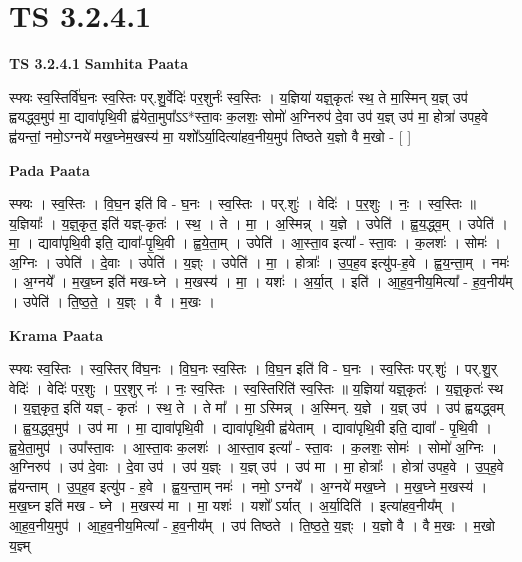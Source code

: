 \documentclass[17pt]{extarticle}
\begin{document}

\section{ TS 3.2.4.1 }

\textbf{TS 3.2.4.1 } \newline
\textbf{Samhita Paata} \newline

स्फ्यः स्व॒स्तिर्वि॑घ॒नः स्व॒स्तिः पर्.शु॒र्वेदिः॑ पर॒शुर्नः॑ स्व॒स्तिः । य॒ज्ञिया॑ यज्ञ्॒कृतः॑ स्थ॒ ते मा॒स्मिन् य॒ज्ञ् उप॑ ह्वयद्ध्व॒मुप॑ मा॒ द्यावा॑पृथि॒वी ह्व॑येता॒मुपा᳚ऽऽ*स्ता॒वः क॒लशः॒ सोमो॑ अ॒ग्निरुप॑ दे॒वा उप॑ य॒ज्ञ् उप॑ मा॒ होत्रा॑ उपह॒वे ह्व॑यन्तां॒ नमो॒ऽग्नये॑ मख॒घ्नेम॒खस्य॑ मा॒ यशो᳚ऽर्या॒दित्या॑हव॒नीय॒मुप॑ तिष्ठते य॒ज्ञो वै म॒खो - [  ] \newline

\textbf{Pada Paata} \newline

स्फ्यः । स्व॒स्तिः । वि॒घ॒न इति॑ वि - घ॒नः । स्व॒स्तिः । पर्.शुः॑ । वेदिः॑ । प॒र॒शुः । नः॒ । स्व॒स्तिः ॥ य॒ज्ञियाः᳚ । य॒ज्ञ्॒कृत॒ इति॑ यज्ञ्-कृतः॑ । स्थ॒ । ते । मा॒ । अ॒स्मिन्न् । य॒ज्ञे । उपेति॑ । ह्व॒य॒द्ध्व॒म् । उपेति॑ । मा॒ । द्यावा॑पृथि॒वी इति॒ द्यावा᳚-पृ॒थि॒वी । ह्व॒ये॒ता॒म् । उपेति॑ । आ॒स्ता॒व इत्या᳚ - स्ता॒वः । क॒लशः॑ । सोमः॑ । अ॒ग्निः । उपेति॑ । दे॒वाः । उपेति॑ । य॒ज्ञ्ः । उपेति॑ । मा॒ । होत्राः᳚ । उ॒प॒ह॒व इत्यु॑प-ह॒वे । ह्व॒य॒न्ता॒म् । नमः॑ । अ॒ग्नये᳚ । म॒ख॒घ्न इति॑ मख-घ्ने । म॒खस्य॑ । मा॒ । यशः॑ । अ॒र्या॒त् । इति॑ । आ॒ह॒व॒नीय॒मित्या᳚ - ह॒व॒नीय᳚म् । उपेति॑ । ति॒ष्ठ॒ते॒ । य॒ज्ञ्ः । वै । म॒खः ।  \newline


\textbf{Krama Paata} \newline

स्फ्यः स्व॒स्तिः । स्व॒स्तिर् वि॑घ॒नः । वि॒घ॒नः स्व॒स्तिः । वि॒घ॒न इति॑ वि - घ॒नः । स्व॒स्तिः पर्.शुः॑ । पर्.शु॒र् वेदिः॑ । वेदिः॑ पर॒शुः । प॒र॒शुर् नः॑ । नः॒ स्व॒स्तिः । स्व॒स्तिरिति॑ स्व॒स्तिः ॥ य॒ज्ञिया॑ यज्ञ्॒कृतः॑ । य॒ज्ञ्॒कृतः॑ स्थ । य॒ज्ञ्॒कृत॒ इति॑ यज्ञ् - कृतः॑ । स्थ॒ ते । ते मा᳚ । मा॒ ऽस्मिन्न् । अ॒स्मिन्. य॒ज्ञे । य॒ज्ञ् उप॑ । उप॑ ह्वयद्ध्वम् । ह्व॒य॒द्ध्व॒मुप॑ । उप॑ मा । मा॒ द्यावा॑पृथि॒वी । द्यावा॑पृथि॒वी ह्व॑येताम् । द्यावा॑पृथि॒वी इति॒ द्यावा᳚ - पृ॒थि॒वी । ह्व॒ये॒ता॒मुप॑ । उपा᳚स्ता॒वः । आ॒स्ता॒वः क॒लशः॑ । आ॒स्ता॒व इत्या᳚ - स्ता॒वः । क॒लशः॒ सोमः॑ । सोमो॑ अ॒ग्निः । अ॒ग्निरुप॑ । उप॑ दे॒वाः । दे॒वा उप॑ । उप॑ य॒ज्ञ्ः । य॒ज्ञ् उप॑ । उप॑ मा । मा॒ होत्राः᳚ । होत्रा॑ उपह॒वे । उ॒प॒ह॒वे ह्व॑यन्ताम् । उ॒प॒ह॒व इत्यु॑प - ह॒वे । ह्व॒य॒न्ता॒म् नमः॑ । नमो॒ ऽग्नये᳚ । अ॒ग्नये॑ मख॒घ्ने । म॒ख॒घ्ने म॒खस्य॑ । म॒ख॒घ्न इति॑ मख - घ्ने । म॒खस्य॑ मा । मा॒ यशः॑ । यशो᳚ ऽर्यात् । अ॒र्या॒दिति॑ । इत्या॑हव॒नीय᳚म् । आ॒ह॒व॒नीय॒मुप॑ । आ॒ह॒व॒नीय॒मित्या᳚ - ह॒व॒नीय᳚म् । उप॑ तिष्ठते । ति॒ष्ठ॒ते॒ य॒ज्ञ्ः । य॒ज्ञो वै । वै म॒खः । म॒खो य॒ज्ञ्म् \newline
\end{document}
